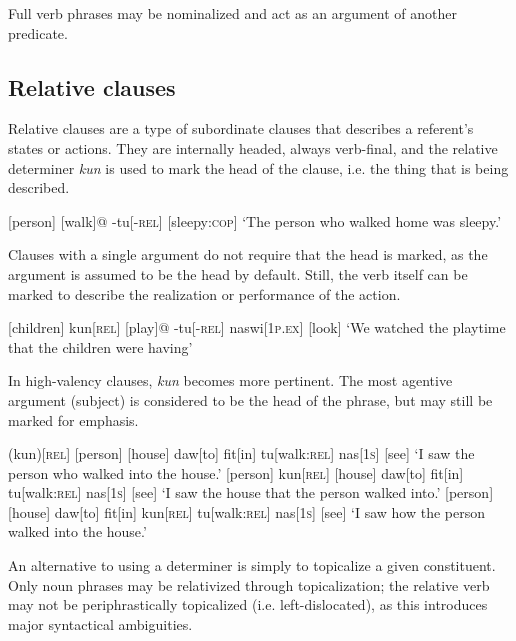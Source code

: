 Full verb phrases may be nominalized and act as an argument of another predicate.

\subsection{Relative clauses}

Relative clauses are a type of subordinate clauses that describes a referent's states or actions. They are internally headed, always verb-final, and the relative determiner \emph{kun} is used to mark the head of the clause, i.e. the thing that is being described.

\ex
\begingl
{}[person]
[walk]@
-tu[\textsc{-rel}]
[sleepy\textsc{:cop}]
\glft `The person who walked home was sleepy.'
\endgl
\xe

Clauses with a single argument do not require that the head is marked, as the argument is assumed to be the head by default. Still, the verb itself can be marked to describe the realization or performance of the action.

\ex
\begingl
{}[children]
kun[\textsc{rel}]
[play]@
-tu[\textsc{-rel}]
naswi[\textsc{1p.ex}]
[look]
\glft `We watched the playtime that the children were having'
\endgl
\xe

In high-valency clauses, \emph{kun} becomes more pertinent. The most agentive argument (subject) is considered to be the head of the phrase, but may still be marked for emphasis.

\pex
\a
\begingl
(kun)[\textsc{rel}]
[person]
[house]
daw[to]
fit[in]
tu[walk\textsc{:rel}]
nas[\textsc{1s}]
[see]
\glft `I saw the person who walked into the house.'
\endgl
\a
\begingl
{}[person]
kun[\textsc{rel}]
[house]
daw[to]
fit[in]
tu[walk\textsc{:rel}]
nas[\textsc{1s}]
[see]
\glft `I saw the house that the person walked into.'
\endgl
\a
\begingl
{}[person]
[house]
daw[to]
fit[in]
kun[\textsc{rel}]
tu[walk\textsc{:rel}]
nas[\textsc{1s}]
[see]
\glft `I saw how the person walked into the house.'
\endgl
\xe

An alternative to using a determiner is simply to topicalize a given constituent. Only noun phrases may be relativized through topicalization; the relative verb may not be periphrastically topicalized (i.e. left-dislocated), as this introduces major syntactical ambiguities.

